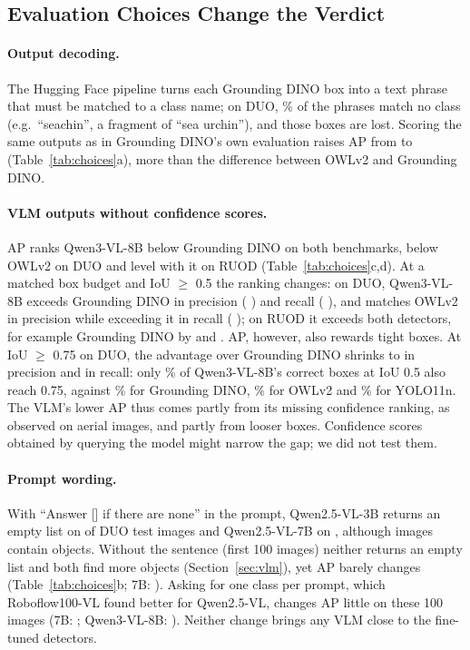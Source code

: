 \documentclass[letterpaper]{article} %
\begin{document}
\subsection{Evaluation Choices Change the Verdict}
\label{sec:choices}



\paragraph{Output decoding.}
The Hugging Face pipeline turns each Grounding DINO box into a text phrase that must be matched to a class name; on DUO, \pctUnmatchedText\% of the phrases match no class (e.g.\ ``seachin'', a fragment of ``sea urchin''), and those boxes are lost. Scoring the same outputs as in Grounding DINO's own evaluation raises AP from \apGDtext{} to \apGD{} (Table~\ref{tab:choices}a), more than the difference between OWLv2 and Grounding DINO.

\paragraph{VLM outputs without confidence scores.}
AP ranks Qwen3-VL-8B below Grounding DINO on both benchmarks, below OWLv2 on DUO and level with it on RUOD (Table~\ref{tab:choices}c,d). At a matched box budget and IoU $\geq$ 0.5 the ranking changes: on DUO, Qwen3-VL-8B exceeds Grounding DINO in precision (\bdPGD{} \bdciPGD) and recall (\bdRGD{} \bdciRGD), and matches OWLv2 in precision while exceeding it in recall (\bdROWL{} \bdciROWL); on RUOD it exceeds both detectors, for example Grounding DINO by \rbdPGD{} \rbdciPGD{} and \rbdRGD{} \rbdciRGD. AP, however, also rewards tight boxes. At IoU $\geq$ 0.75 on DUO, the advantage over Grounding DINO shrinks to \btdPGD{} \btdciPGD{} in precision and \btdRGD{} \btdciRGD{} in recall: only \keepTightQwenVL\% of Qwen3-VL-8B's correct boxes at IoU 0.5 also reach 0.75, against \keepTightGD\% for Grounding DINO, \keepTightOWL\% for OWLv2 and \keepTightYoloN\% for YOLO11n. The VLM's lower AP thus comes partly from its missing confidence ranking, as \citet{li2025aerialmlm} observed on aerial images, and partly from looser boxes. Confidence scores obtained by querying the model \citep{gare2026detpo} might narrow the gap; we did not test them.

\paragraph{Prompt wording.}
With ``Answer [] if there are none'' in the prompt, Qwen2.5-VL-3B returns an empty list on \nEmptyQThree{} of \nRepQThree{} DUO test images and Qwen2.5-VL-7B on \nEmptyQSeven, although \nImagesWithObjects{} images contain objects. Without the sentence (first 100 images) neither returns an empty list and both find more objects (Section~\ref{sec:vlm}), yet AP barely changes (Table~\ref{tab:choices}b; 7B: \dPromptSeven{} \dciPromptSeven). Asking for one class per prompt, which Roboflow100-VL found better for Qwen2.5-VL, changes AP little on these 100 images (7B: \dSingleSeven{} \dciSingleSeven; Qwen3-VL-8B: \dSingleQwen{} \dciSingleQwen). Neither change brings any VLM close to the fine-tuned detectors.
\end{document}
